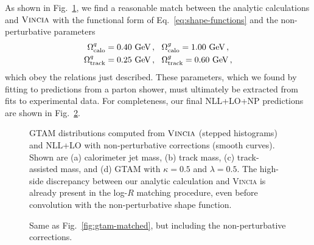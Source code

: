 \documentclass[letterpaper,11pt]{article}
\newcommand{\Fig}[1]{Fig.~\ref{#1}}
\newcommand{\Eq}[1]{Eq.~\eqref{#1}}
\begin{document}
As shown in \Fig{fig:np-shape-fcn}, we find a reasonable match between the analytic calculations and $\textsc{Vincia}$ with the functional form of \Eq{eq:shape-functions} and the non-perturbative parameters
\begin{align}
\begin{split}
\Omega_{\rm calo}^q &= 0.40\ \mbox{GeV}\,,\ \ \Omega_{\rm calo}^g = 1.00\ \mbox{GeV}\,, \\
\Omega_{\rm track}^q &= 0.25\ \mbox{GeV}\,,\ \ \Omega_{\rm track}^g = 0.60\ \mbox{GeV}\,,
\end{split}
\end{align}
which obey the relations just described.
%
These parameters, which we found by fitting to predictions from a parton shower, must ultimately be extracted from fits to experimental data.
%
For completeness, our final NLL+LO+NP predictions are shown in \Fig{fig:finaldistributions}.



\begin{figure}[t]
	\centering
	
	\caption{GTAM distributions computed from $\textsc{Vincia}$ (stepped histograms) and NLL+LO with non-perturbative corrections (smooth curves). Shown are (a) calorimeter jet mass, (b) track mass, (c) track-assisted mass, and (d) GTAM with $\kappa=0.5$ and $\lambda = 0.5$.  The high-side discrepancy between our analytic calculation and \textsc{Vincia} is already present in the log-$R$ matching procedure, even before convolution with the non-perturbative shape function.}
	\label{fig:np-shape-fcn} 
\end{figure}


\begin{figure}[t]
	\centering
	
	\caption{Same as \Fig{fig:gtam-matched}, but including the non-perturbative corrections.}
	\label{fig:finaldistributions} 
\end{figure}
\end{document}
